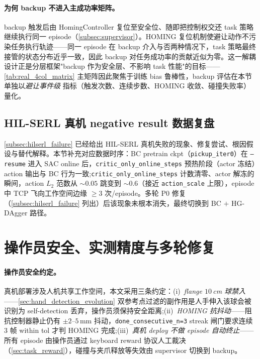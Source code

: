 \paragraph{为何 backup 不进入主成功率矩阵。}backup 触发后由 HomingController 复位至安全位、随即把控制权交还 task 策略继续执行同一 episode（\cref{subsec:supervisor}）。HOMING 复位机制使避让动作不污染任务执行轨迹——同一 episode 在 backup 介入与否两种情况下，task 策略最终接管的状态分布近乎一致，因此 backup 对任务成功率的贡献近似为零。这一解耦设计正是分层框架"backup 作为安全层、不影响 task 性能"的目标——\cref{tab:real_4col_matrix} 主矩阵因此聚焦于训练 bias 鲁棒性，backup 评估在本节单独以\emph{避让事件级} 指标（触发次数、连续步数、HOMING 收敛、碰撞失败率）量化。

\subsection{HIL-SERL 真机 negative result 数据复盘}\label{subsec:exp_hilserl_failure}

\cref{subsec:hilserl_failure} 已经给出 HIL-SERL 真机失败的现象、修复尝试、根因假设与替代解释。本节补充对应数据时序：BC pretrain ckpt（\texttt{pickup\_iter0}）在 \texttt{--resume} 进入 SAC online 后，\texttt{critic\_only\_online\_steps} 预热阶段（actor 冻结）action 输出与 BC 行为一致;\texttt{critic\_only\_online\_steps} 计数清零、actor 解冻的瞬间，action $L_2$ 范数从 $\sim 0.05$ 跳变到 $\sim 0.6$（接近 \texttt{action\_scale} 上限），episode 中 TCP 飞向工作空间边缘 $\geq 3$ 次/episode。多轮 P0 修复（\cref{subsec:hilserl_failure} 列出）后该现象未根本消失，最终切换到 BC $+$ HG-DAgger 路径。

\section{操作员安全、实测精度与多轮修复}\label{sec:operator_safety}

\paragraph{操作员安全约定。}真机部署涉及人机共享工作空间，本文采用三条约定：(i)~\emph{flange $10$\,cm 球禁入}——\cref{sec:hand_detection_evolution} 双参考点过滤的副作用是人手伸入该球会被识别为 self-detection 丢弃，操作员须保持安全距离;(ii)~\emph{HOMING 抗抖动}——阻抗控制器静止仍有 $\pm 2$–$5$\,mm 抖动，\texttt{done\_consecutive\_n=3} streak 闸门要求连续 $3$ 帧 within tol 才判 HOMING 完成;(iii)~\emph{真机 deploy 不做 episode 自动终止}——所有 episode 由操作员通过 keyboard reward 协议人工裁决（\cref{sec:task_reward}），碰撞与夹爪释放等失效由 supervisor 切换到 backup。

